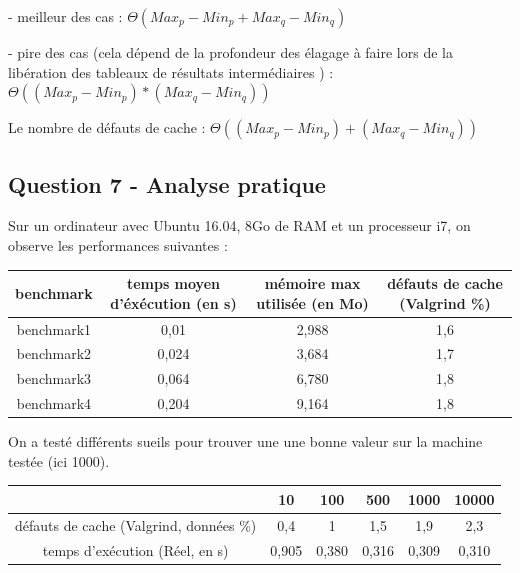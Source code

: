 \documentclass[paper=a4, fontsize=11pt]{scrartcl} %
\begin{document}
- meilleur des cas : $\Theta(Max_p - Min_p + Max_q - Min_q)$

- pire des cas (cela dépend de la profondeur des élagage à faire lors de la libération des tableaux de résultats intermédiaires ) : $\Theta((Max_p - Min_p) * (Max_q - Min_q))$

Le nombre de défauts de cache : $\Theta((Max_p - Min_p) + (Max_q - Min_q))$

\subsection*{Question 7 - Analyse pratique}

Sur un ordinateur avec Ubuntu 16.04, 8Go de RAM et un processeur i7, on observe les performances suivantes :

\begin{tabular}{ | c | c | c | c |}
    \hline
        benchmark& temps moyen d'éxécution (en s)& mémoire max utilisée (en Mo) & défauts de cache (Valgrind \%)\\ \hline\hline
        benchmark1 & 0,01 & 2,988 & 1,6\\ \hline
        benchmark2 & 0,024 & 3,684 & 1,7\\ \hline
        benchmark3 & 0,064 & 6,780 & 1,8\\ \hline
        benchmark4 & 0,204 & 9,164 & 1,8\\
    \hline
 \end{tabular}

 On a testé différents sueils pour trouver une une bonne valeur sur la machine testée (ici 1000).

\begin{tabular}{ | c | c | c | c | c | c | }
 \hline
     & 10 & 100 & 500 & 1000 & 10000\\ \hline
     défauts de cache (Valgrind, données \%) & 0,4 & 1 & 1,5 & 1,9 & 2,3\\ \hline
     temps d'exécution (Réel, en s) & 0,905 & 0,380 & 0,316 & 0,309 & 0,310\\
 \hline
\end{tabular}
\end{document}
